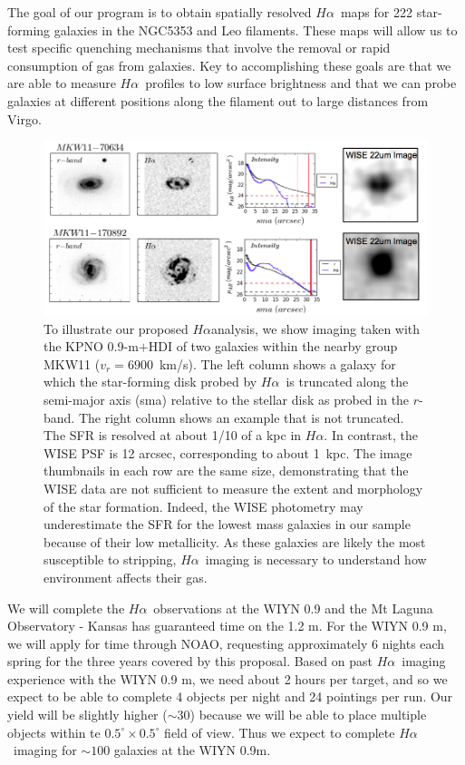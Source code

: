 \documentclass[12pt, preprint]{aastex}
\newcommand{\ha}{$H\alpha$}
\begin{document}
The goal of our program is to obtain spatially resolved \ha \ maps for 222 star-forming galaxies in
the NGC5353 and Leo filaments. These maps will allow us to test specific quenching
mechanisms that involve the removal or rapid consumption of gas from galaxies. Key to accomplishing
these goals are that we are able to measure \ha \ profiles to low surface brightness and that we can
probe galaxies at different positions along the filament out to large
distances from Virgo.
\begin{figure}[h]
\centering
\includegraphics[width=.85\textwidth]{HalphaProfileWISE.png}
\caption{\small
To illustrate our proposed \ha  analysis, we show
imaging taken with the KPNO 0.9-m$+$HDI of two galaxies within the
nearby group  MKW11 ($v_r = 6900$~km/s). The left column shows a
galaxy for which the star-forming disk probed by \ha \ is truncated
along the semi-major axis (sma)  relative to the stellar disk as
probed in the $r$-band. The right column  shows an example that is not
truncated.  The SFR is resolved  at about 1/10 of a kpc in \ha. In
contrast, the WISE PSF is 12 arcsec, corresponding to about 1~kpc. The image thumbnails in each row are the same size, demonstrating
that the WISE data are not sufficient to measure the extent and
morphology of the star formation.   Indeed, the WISE photometry may
underestimate the SFR for  the lowest mass galaxies in our sample
because of their low metallicity.  As these galaxies are likely the
most susceptible to stripping, \ha\ imaging is necessary to understand
how environment affects their gas.}
\label{fig3}
\end{figure}


We will complete the \ha \ observations at the WIYN 0.9 and the Mt
Laguna Observatory - Kansas has guaranteed time on the 1.2 m.
For the WIYN 0.9 m, we will apply for time through NOAO, requesting
approximately 6 nights each spring for the three years covered by this
proposal.  Based on past \ha \ imaging experience with the WIYN 0.9 m,
we need about 2 hours per target, and so we expect to be able to
complete 4 objects per night and 24 pointings per run.  Our yield will
be slightly higher ($\sim 30$) because we will be able to place multiple objects within
te $0.5^\circ \times 0.5^\circ$ field of view.  Thus we expect to
complete \ha \ imaging for
$\sim 100$ galaxies at the WIYN 0.9m. 
\end{document}
